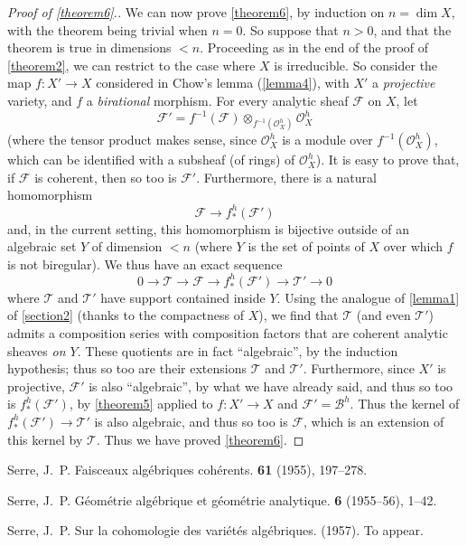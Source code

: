 \documentclass{article}
\theoremstyle{plain}
\theoremstyle{definition}
\newcommand{\sh}[1]{{\mathscr{#1}}}
\newcommand{\oldpage}[1]{\marginpar{\footnotesize$\Big\vert$ \textit{p.~#1}}}
\begin{document}
\begin{proof}[Proof of \cref{theorem6}.]
  We can now prove \cref{theorem6}, by induction on $n=\dim X$, with the theorem being trivial when $n=0$.
  So suppose that $n>0$, and that the theorem is true in dimensions $<n$.
  Proceeding as in the end of the proof of \cref{theorem2}, we can restrict to the case where $X$ is irreducible.
  So consider the map $f\colon X'\to X$ considered in Chow's lemma (\cref{lemma4}), with $X'$ a \emph{projective} variety, and $f$ a \emph{birational} morphism.
  For every analytic sheaf $\sh{F}$ on $X$, let
  \[
    \sh{F}' = f^{-1}(\sh{F})\otimes_{f^{-1}(\sh{O}_X^h)}\sh{O}_X^h
  \]
  (where the tensor product makes sense, since $\sh{O}_X^h$ is a module over $f^{-1}(\sh{O}_X^h)$, which can be identified with a subsheaf (of rings) of $\sh{O}_X^h$).
  It is easy to prove that, if $\sh{F}$ is coherent, then so too is $\sh{F}'$.
  Furthermore, there is a natural homomorphism
  \oldpage{2-16}
  \[
    \sh{F} \to f_*^h(\sh{F}')
  \]
  and, in the current setting, this homomorphism is bijective outside of an algebraic set $Y$ of dimension $<n$ (where $Y$ is the set of points of $X$ over which $f$ is not biregular).
  We thus have an exact sequence
  \[
    0 \to \sh{T} \to \sh{F} \to f_*^h(\sh{F}') \to \sh{T}' \to 0
  \]
  where $\sh{T}$ and $\sh{T'}$ have support contained inside $Y$.
  Using the analogue of \cref{lemma1} of \cref{section2} (thanks to the compactness of $X$), we find that $\sh{T}$ (and even $\sh{T}'$) admits a composition series with composition factors that are coherent analytic sheaves \emph{on $Y$}.
  These quotients are in fact ``algebraic'', by the induction hypothesis;
  thus so too are their extensions $\sh{T}$ and $\sh{T}'$.
  Furthermore, since $X'$ is projective, $\sh{F}'$ is also ``algebraic'', by what we have already said, and thus so too is $f_*^h(\sh{F}')$, by \cref{theorem5} applied to $f\colon X'\to X$ and $\sh{F}'=\sh{B}^h$.
  Thus the kernel of $f_*^h(\sh{F}')\to\sh{T}'$ is also algebraic, and thus so too is $\sh{F}$, which is an extension of this kernel by $\sh{T}$.
  Thus we have proved \cref{theorem6}.
\end{proof}



\nocite{*}

\begin{thebibliography}{1}

  {\sc Serre, J.~P.}
  \newblock Faisceaux alg\'{e}briques coh\'{e}rents.
   \textbf{61} (1955), 197--278.

  {\sc Serre, J.~P.}
  \newblock G\'{e}om\'{e}trie alg\'{e}brique et g\'{e}om\'{e}trie analytique.
   \textbf{6} (1955--56), 1--42.

  {\sc Serre, J.~P.}
  \newblock Sur la cohomologie des vari\'{e}t\'{e}s alg\'{e}briques.
   (1957).
  \newblock To appear.

\end{thebibliography}
\end{document}

